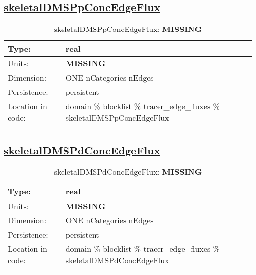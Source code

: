 \subsection[skeletalDMSPpConcEdgeFlux]{\hyperref[sec:var_tab_tracer_edge_fluxes]{skeletalDMSPpConcEdgeFlux}}
\label{subsec:var_sec_tracer_edge_fluxes_skeletalDMSPpConcEdgeFlux}
\begin{center}
\begin{longtable}{| p{2.0in} | p{4.0in} |}
        \hline 
        Type: & real \\
        \hline 
        Units: & {\bf \color{red} MISSING} \\
        \hline 
        Dimension: & ONE nCategories nEdges \\
        \hline 
        Persistence: & persistent \\
        \hline 
         Location in code: & domain \% blocklist \% tracer\_edge\_fluxes \% skeletalDMSPpConcEdgeFlux \\
         \hline 
    \caption{skeletalDMSPpConcEdgeFlux: {\bf \color{red} MISSING}}
\end{longtable}
\end{center}
\subsection[skeletalDMSPdConcEdgeFlux]{\hyperref[sec:var_tab_tracer_edge_fluxes]{skeletalDMSPdConcEdgeFlux}}
\label{subsec:var_sec_tracer_edge_fluxes_skeletalDMSPdConcEdgeFlux}
\begin{center}
\begin{longtable}{| p{2.0in} | p{4.0in} |}
        \hline 
        Type: & real \\
        \hline 
        Units: & {\bf \color{red} MISSING} \\
        \hline 
        Dimension: & ONE nCategories nEdges \\
        \hline 
        Persistence: & persistent \\
        \hline 
         Location in code: & domain \% blocklist \% tracer\_edge\_fluxes \% skeletalDMSPdConcEdgeFlux \\
         \hline 
    \caption{skeletalDMSPdConcEdgeFlux: {\bf \color{red} MISSING}}
\end{longtable}
\end{center}

